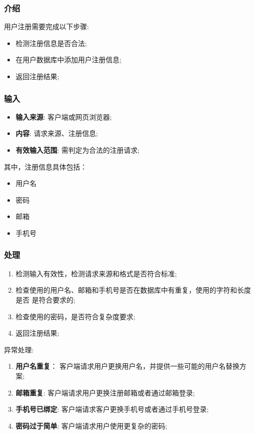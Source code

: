 \begin{enumerate}
\subsubsection{介绍}
用户注册需要完成以下步骤:
	\begin{itemize}
		\item 检测注册信息是否合法;
		\item 在用户数据库中添加用户注册信息;
		\item 返回注册结果;
	\end{itemize}
\subsubsection{输入}
	\begin{itemize}
		\item \textbf{输入来源}: 客户端或网页浏览器;
		\item \textbf{内容}: 请求来源、注册信息;
		\item \textbf{有效输入范围}: 需判定为合法的注册请求;
	\end{itemize}
	\noindent 其中，注册信息具体包括：
	\begin{itemize}
		\item 用户名 
		\item 密码
		\item 邮箱
    \item 手机号
	\end{itemize}
\subsubsection{处理}
	\begin{enumerate}
		\item 检测输入有效性，检测请求来源和格式是否符合标准;
		\item 检查使用的用户名、邮箱和手机号是否在数据库中有重复，使用的字符和长度是否
			是符合要求的;
		\item 检查使用的密码，是否符合复杂度要求;
		\item 返回注册结果;
	\end{enumerate}
	\noindent 异常处理: 
	\begin{enumerate}
		\item \textbf{用户名重复}：
		  客户端请求用户更换用户名，并提供一些可能的用户名替换方案;
    \item \textbf{邮箱重复}:
      客户端请求用户更换注册邮箱或者通过邮箱登录;
    \item \textbf{手机号已绑定}:
      客户端请求客户更换手机号或者通过手机号登录;
		\item \textbf{密码过于简单}:
      客户端请求用户使用更复杂的密码;
	\end{enumerate}

\end{enumerate}
